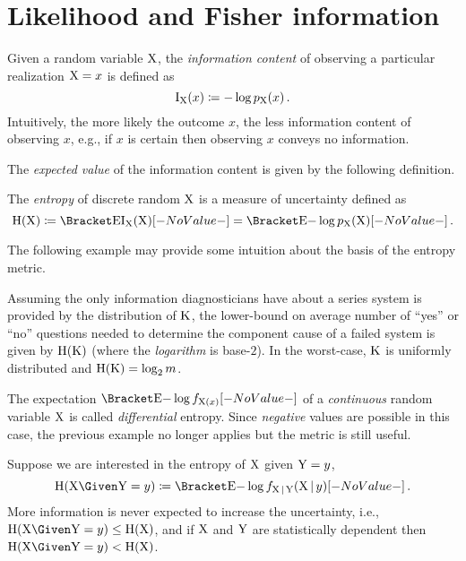\documentclass[../main.tex]{subfiles}
\begin{document}
\chapter{Likelihood and Fisher information}
\label{sec:general_fisher_info}
Given a random variable $\mathrm{X}$, the \emph{information content} of observing a particular realization $\mathrm{X} = x$ is defined as
\begin{equation}
\operatorname{I}_{\mathrm{X}}(x) \coloneqq -\log p_{\mathrm{X}}(x)\,.
\end{equation}
Intuitively, the more likely the outcome $x$, the less information content of observing $x$, e.g., if $x$ is certain then observing $x$ conveys no information.

The \emph{expected value} of the information content is given by the following definition.
\begin{definition}
The \emph{entropy} of discrete random $\mathrm{X}$ is a measure of uncertainty defined as
\begin{equation}
\entropy(\RV{X}) \coloneqq \Expect{\info_{\RV{X}}(\RV{X})} = \Expect{- \log \pmf_{\RV{X}}(\RV{X})}\,.
\end{equation}
\end{definition}

The following example may provide some intuition about the basis of the entropy metric.
\begin{example}
\label{ex:entropy1}
Assuming the only information diagnosticians have about a series system is provided by the distribution of $\mathrm{K}$, the lower-bound on average number of ``yes'' or ``no'' questions needed to determine the component cause of a failed system is given by $\operatorname{H}(\mathrm{K})$ (where the \emph{logarithm} is base-$2$).
In the worst-case, $\mathrm{K}$ is uniformly distributed and $\operatorname{H}(\mathrm{K}) = \log_2 m$.
\end{example}
The expectation $\Expect{-\log \pdf_{\RV{X}(x)}}$ of a \emph{continuous} random variable $\mathrm{X}$ is called \emph{differential} entropy.
Since \emph{negative} values are possible in this case, the previous example no longer applies but the metric is still useful.

Suppose we are interested in the entropy of $\mathrm{X}$ given $\mathrm{Y} = y$,
\begin{equation}
\entropy(\RV{X} \Given \RV{Y} = y) \coloneqq \Expect{-\log \pdf_{\RV{X} \given \RV{Y}}(\RV{X} \given y)}\,.
\end{equation}
More information is never expected to increase the uncertainty, i.e., $\entropy(\RV{X} \Given \RV{Y} = y) \leq \entropy(\RV{X})$, and if $\mathrm{X}$ and $\mathrm{Y}$ are statistically dependent then $\entropy(\RV{X} \Given \RV{Y} = y) < \entropy(\RV{X})$.
\end{document}
